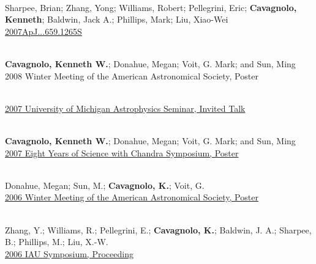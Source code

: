\documentclass[11pt]{cv}
\begin{document}
\begin{llist}
{}\\
Sharpee, Brian; Zhang, Yong; Williams, Robert; Pellegrini, Eric; {\bf Cavagnolo, Kenneth}; Baldwin, Jack A.; Phillips, Mark; Liu, Xiao-Wei\\
\href{http://adsabs.harvard.edu/abs/2007ApJ...659.1265S}{2007ApJ...659.1265S}



{}\\
{\bf Cavagnolo, Kenneth W.}; Donahue, Megan; Voit, G. Mark; and Sun, Ming\\
2008 Winter Meeting of the American Astronomical Society, Poster

{}\\
\href{http://www.pa.msu.edu/people/cavagnolo/annarbor_07.pdf}{2007
University of Michigan Astrophysics Seminar, Invited Talk}

{}\\
{\bf Cavagnolo, Kenneth W.}; Donahue, Megan; Voit, G. Mark; and Sun, Ming\\
\href{http://www.pa.msu.edu/people/cavagnolo/chansym07_poster.pdf}{2007
Eight Years of Science with Chandra Symposium, Poster}

{}\\
Donahue, Megan; Sun, M.; {\bf Cavagnolo, K.}; Voit, G.\\
\href{http://adsabs.harvard.edu/abs/2006AAS...209.7711D}{2006 Winter
Meeting of the American Astronomical Society, Poster}

{}\\
Zhang, Y.; Williams, R.; Pellegrini, E.; {\bf Cavagnolo, K.}; Baldwin,
J. A.; Sharpee, B.; Phillips, M.; Liu, X.-W.\\
\href{http://adsabs.harvard.edu/abs/2006IAUS..234..549Z}{2006 IAU
Symposium, Proceeding}


\end{llist}
\end{document}
